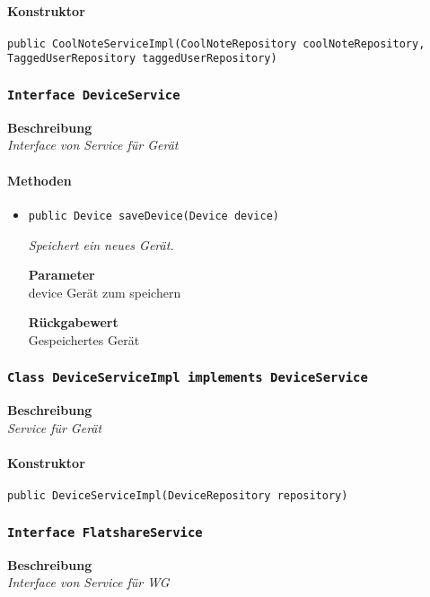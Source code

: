     \paragraph*{Konstruktor}
    \texttt{public CoolNoteServiceImpl(CoolNoteRepository coolNoteRepository, TaggedUserRepository taggedUserRepository)}
    \subsubsection{\texttt{Interface DeviceService}}
    \textbf{Beschreibung} \\
    \textit{Interface von Service für Gerät}
    \paragraph*{Methoden}
    \begin{itemize}
    	\item{\texttt{public Device saveDevice(Device device)}}
    	
    	\textit{Speichert ein neues Gerät.}
    	
    	\textbf{Parameter} \\
    	device Gerät zum speichern
    	
    	\textbf{Rückgabewert} \\
    	Gespeichertes Gerät
    \end{itemize}
    \subsubsection{\texttt{Class DeviceServiceImpl implements DeviceService}}
    \textbf{Beschreibung} \\
    \textit{Service für Gerät}
    \paragraph*{Konstruktor}
    \texttt{public DeviceServiceImpl(DeviceRepository repository)}
    \subsubsection{\texttt{Interface FlatshareService}}
    \textbf{Beschreibung} \\
    \textit{Interface von Service für WG}
